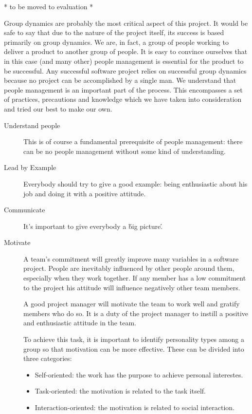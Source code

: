 * to be moved to evaluation *

Group dynamics are probably the most critical aspect of this project.
It would be safe to say that due to the nature of the project itself, its success is based primarily on group dynamics.
We are, in fact, a group of people working to deliver a product to another group of people.
It is easy to convince ourselves that in this case (and many other) people management is essential for the product
to be successful. Any successful software project relies on successful group dynamics because no project can be
accomplished by a single man. We understand that people management is an important part of the process.
This encompasses a set of practices, precautions and knowledge which we have taken into consideration and tried our
best to make our own.

\begin{description}

\item[Understand people]
This is of course a fundamental prerequisite of people management: there can be no people management without
some kind of understanding.

\item[Lead by Example]
Everybody should try to give a good example: being enthusiastic about his job and doing it with a positive attitude.

\item[Communicate]
It's important to give everybody a \'big picture\'.

\item[Motivate]
A team's commitment will greatly improve many variables in a software project.
People are inevitably influenced by other people around them, especially when they work together.
If any member has a low commitment to the project his attitude will influence negatively other team members.

A good project manager will motivate the team to work well and gratify members who do so.
It is a duty of the project manager to instill a positive and enthusiastic attitude in the team.

To achieve this task, it is important to identify personality types among a group so that
motivation can be more effective. These can be divided into three categories:
  \begin{itemize}
  \item Self-oriented: the work has the purpose to achieve personal interestes.
  \item Task-oriented: the motivation is related to the task itself.
  \item Interaction-oriented: the motivation is related to social interaction.
  \end{itemize}


\end{description}
